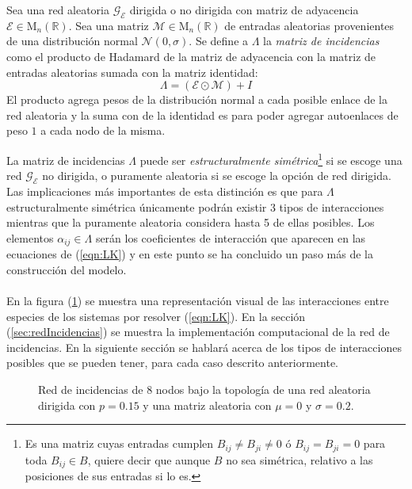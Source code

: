 \begin{definición}\label{def:MatrizIncidencias}
	Sea una red aleatoria $\mathcal{G}_\mathcal{E}$ dirigida o no dirigida con matriz de adyacencia $\mathcal{E}\in\mathrm{M}_n(\mathbb{R})$. Sea una matriz $\mathcal{M}\in\mathrm{M}_n(\mathbb{R})$ de entradas aleatorias provenientes de una distribución normal $\mathcal{N}(0,\sigma)$. Se define a $\Lambda$ la \textit{matriz de incidencias} como el producto de Hadamard \cite{HadamardProduct} de la matriz de adyacencia con la matriz de entradas aleatorias sumada con la matriz identidad:
	\begin{equation}\label{eqn:MatrizIncidencias}
		\Lambda=(\mathcal{E}\odot \mathcal{M}) + I
	\end{equation}
	El producto agrega pesos de la distribución normal a cada posible enlace de la red aleatoria y la suma con de la identidad es para poder agregar autoenlaces de peso $1$ a cada nodo de la misma.
\end{definición}
\setlength{\parindent}{0cm} La matriz de incidencias $\Lambda$ puede ser \textit{estructuralmente simétrica}\footnote{Es una matriz cuyas entradas cumplen $B_{ij}\neq B_{ji}\neq 0$ ó $B_{ij}=B_{ji}=0$ para toda $B_{ij}\in B$, quiere decir que aunque $B$ no sea simétrica, relativo a las posiciones de sus entradas si lo es.} si se escoge una red $\mathcal{G}_\mathcal{E}$ no dirigida, o puramente aleatoria si se escoge la opción  de red dirigida. Las implicaciones más importantes de esta distinción es que para $\Lambda$ estructuralmente simétrica únicamente podrán existir 3 tipos de interacciones mientras que la puramente aleatoria considera hasta 5 de ellas posibles. Los elementos $\alpha_{ij}\in\Lambda$ serán los coeficientes de interacción que aparecen en las ecuaciones de (\ref{eqn:LK}) y en este punto se ha concluido un paso más de la construcción del modelo.\\
\\
En la figura (\ref{fig:RedIncidencias}) se muestra una representación visual de las interacciones entre especies de los sistemas por resolver (\ref{eqn:LK}). En la sección (\ref{sec:redIncidencias}) se muestra la implementación computacional de la red de incidencias. En la siguiente sección se hablará acerca de los tipos de interacciones posibles que se pueden tener, para cada caso descrito anteriormente.
\newpage
\begin{figure} \vspace{-70pt} \begin{center}
		 
	\end{center} 
	\vspace{-52pt} 
	\caption{Red de incidencias de 8 nodos bajo la topología de una red aleatoria dirigida con $p=0.15$ y una matriz aleatoria con $\mu=0$ y $\sigma=0.2$.} 
	\vspace{-10pt}
	\label{fig:RedIncidencias}
\end{figure} 


